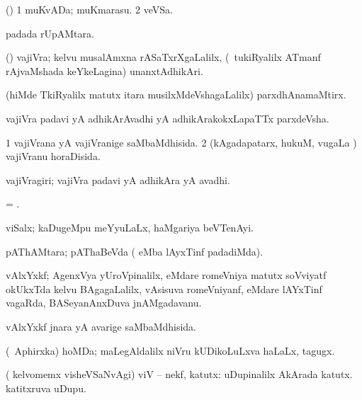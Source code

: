 {{{{{{{{{{{{\bentry 
{} 
\gl{\nA}
\expl{}
\bmng
 (\pArxparx) 
\bnum
\num{1} muKvADa; muKmarasu. 
\num{2} veVSa. 
\enum
\emng
\eentry

\bentry
{} 
\gl{\nA}
\expl{}
\bmng
  padada rUpAMtara. 
\emng
\eentry

\bentry 
{} 
\gl{\nA}
\expl{}
\bmng
 (\ca) vajiVra; kelvu musalAmxna rASaTxrXgaLalilx, (\kanmu\ tukiRyalilx ATmanf rAjvaMshada keYkeLagina) unanxtAdhikAri. 
\emng

\noindent 
\gl{\pagu}
\expl{}
\bmng
  (hiMde TkiRyalilx matutx itara musilxMdeVshagaLalilx) parxdhAnamaMtirx. 
\emng
\eentry

\bentry 
{} 
\gl{\nA}
\expl{}
\bmng
 vajiVra padavi yA adhikArAvadhi yA adhikArakokxLapaTTx parxdeVsha. 
\emng
\eentry

\bentry
{} 
\gl{\gu}
\expl{}
\bmng
\bnum
\num{1} vajiVrana yA vajiVranige saMbaMdhisida. 
\num{2} (kAgadapatarx, hukuM, \mo vugaLa \vi) vajiVranu horaDisida. 
\enum
\emng
\eentry

\bentry
{} 
\gl{\nA}
\expl{}
\bmng
 vajiVragiri; vajiVra padavi yA adhikAra yA avadhi. 
\emng
\eentry

\bentry 
{} 
\gl{\nA}
\expl{}
\bmng
= . 
\emng
\eentry

\bentry
{} 
\gl{\nA}
\expl{}
\bmng
 viSalx; kaDugeMpu meYyuLaLx, haMgariya beVTenAyi. 
\emng
\eentry

\bentry 
{} 
\gl{\saMkiSx}
\expl{}
\bmng
 pAThAMtara; pAThaBeVda ( eMba lAyxTinf padadiMda). 
\emng
\eentry

\bentry
{} 
\gl{\nA}
\expl{}
\bmng
 vAlxYxkf; AgenxVya yUroVpinalilx, eMdare romeVniya matutx soVviyatf okUkxTda kelvu BAgagaLalilx, vAsisuva romeVniyanf, eMdare lAYxTinf vagaRda, BASeyanAnxDuva jnAMgadavanu. 
\emng
\eentry

\bentry 
{} 
\gl{\gu}
\expl{}
\bmng
 vAlxYxkf jnara yA avarige saMbaMdhisida. 
\emng
\eentry

\bentry 
{} 
\gl{\nA}
\expl{}
\bmng
 (\da\ Aphirxka) hoMDa; maLegAldalilx niVru kUDikoLuLxva haLaLx, tagugx. 
\emng
\eentry

\bentry
{}
\gl{\nA}
\expl{}
\bmng
( kelvomemx visheVSaNvAgi) viV -- nekf, katutx: 
\banum
{} uDupinalilx  AkArada katutx. 
  katitxruva uDupu. 
\eanum
\emng
\eentry

}}}}}}}}}}}}
